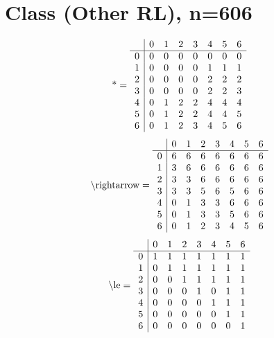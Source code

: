 \documentclass[11pt]{article}
\begin{document}
\section{Class (Other RL), n=606}
\[\text{*} = 
\begin{array}{r | r r r r r r r}
 & 0 & 1 & 2 & 3 & 4 & 5 & 6 \\ \hline
0 & 0 & 0 & 0 & 0 & 0 & 0 & 0 \\
1 & 0 & 0 & 0 & 0 & 1 & 1 & 1 \\
2 & 0 & 0 & 0 & 0 & 2 & 2 & 2 \\
3 & 0 & 0 & 0 & 0 & 2 & 2 & 3 \\
4 & 0 & 1 & 2 & 2 & 4 & 4 & 4 \\
5 & 0 & 1 & 2 & 2 & 4 & 4 & 5 \\
6 & 0 & 1 & 2 & 3 & 4 & 5 & 6 \\
\end{array}
\]
\[\text{\textbackslash rightarrow} = 
\begin{array}{r | r r r r r r r}
 & 0 & 1 & 2 & 3 & 4 & 5 & 6 \\ \hline
0 & 6 & 6 & 6 & 6 & 6 & 6 & 6 \\
1 & 3 & 6 & 6 & 6 & 6 & 6 & 6 \\
2 & 3 & 3 & 6 & 6 & 6 & 6 & 6 \\
3 & 3 & 3 & 5 & 6 & 5 & 6 & 6 \\
4 & 0 & 1 & 3 & 3 & 6 & 6 & 6 \\
5 & 0 & 1 & 3 & 3 & 5 & 6 & 6 \\
6 & 0 & 1 & 2 & 3 & 4 & 5 & 6 \\
\end{array}
\]
\[\text{\textbackslash le} = 
\begin{array}{r | r r r r r r r}
 & 0 & 1 & 2 & 3 & 4 & 5 & 6 \\ \hline
0 & 1 & 1 & 1 & 1 & 1 & 1 & 1 \\
1 & 0 & 1 & 1 & 1 & 1 & 1 & 1 \\
2 & 0 & 0 & 1 & 1 & 1 & 1 & 1 \\
3 & 0 & 0 & 0 & 1 & 0 & 1 & 1 \\
4 & 0 & 0 & 0 & 0 & 1 & 1 & 1 \\
5 & 0 & 0 & 0 & 0 & 0 & 1 & 1 \\
6 & 0 & 0 & 0 & 0 & 0 & 0 & 1 \\
\end{array}
\]
\end{document}
